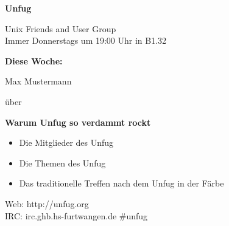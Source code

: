 \documentclass[
    headinclude=false,
    footinclude=false,
    paper=A4,
    paper=portrait,
    pagesize
]{scrartcl}
\newcommand{\referee}{Max Mustermann}
\newcommand{\thema}{Warum Unfug so verdammt rockt}
\newcommand{\desc}{
    \begin{itemize}
        \item Die Mitglieder des Unfug
        \item Die Themen des Unfug
        \item Das traditionelle Treffen nach dem Unfug in der Färbe
    \end{itemize}
}
\begin{document}
    \thispagestyle{empty}

    \begin{mdframed}[style=mdunfuggreen]
        \begin{center}
            \vspace{0.7cm}

            {\fontsize{80}{96} \selectfont \textbf{Unfug}}

            \begin{Huge}
                \vspace{0.7cm}
                Unix Friends and User Group
                \vspace{0.7cm} \\
                Immer Donnerstags um 19:00 Uhr in B1.32
                \vspace{0.7cm}
            \end{Huge}

        \end{center}
    \end{mdframed}

    \begin{mdframed}[style=mdunfugblank]
        \begin{center}
            {\fontsize{40}{40} \selectfont \textbf{Diese Woche:}}

            \begin{Huge}
                \vspace{1cm}
                \referee

                \vspace{1cm}
                über

                \vspace{1cm}
                {\fontsize{40}{40} \selectfont \textbf{\thema}}

                \vspace{1cm}
                \desc
            \end{Huge}

        \end{center}
    \end{mdframed}

    \vfill{}

    \begin{mdframed}[style=mdunfugblank]
        \begin{center}
            \begin{huge}
                Web: http://unfug.org \\
                IRC: irc.ghb.hs-furtwangen.de \#unfug
            \end{huge}
        \end{center}
    \end{mdframed}
\end{document}
